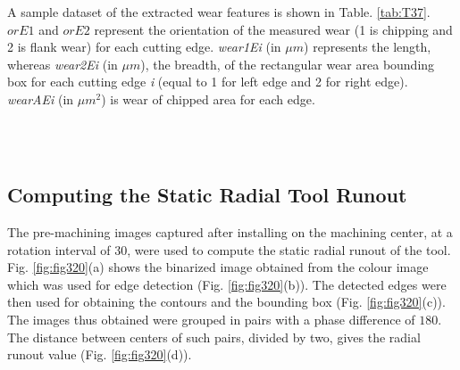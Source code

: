 \documentclass[preprint,review,12pt]{elsarticle}
\begin{document}
A sample dataset of the extracted wear features is shown in Table. \ref{tab:T37}. $orE1$ and $orE2$ represent the orientation of the measured wear (1 is chipping and 2 is flank wear) for each cutting edge. \emph{wear1Ei} (in $\mu{m}$) represents the length, whereas \emph{wear2Ei} (in $\mu{m}$), the breadth, of the rectangular wear area bounding box for each cutting edge \emph{i} (equal to 1 for left edge and 2 for right edge). \emph{wearAEi} (in $\mu{m}^2$) is wear of chipped area for each edge. \par

\begin{minipage}{\linewidth}
   \label{tab:T37}
  \centering
\end{minipage} \\\\

\subsection{Computing the Static Radial Tool Runout}\label{sec:sec43}
 The pre-machining images captured after installing on the machining center, at a rotation interval of $30$\textdegree, were used to compute the static radial runout of the tool. Fig. \ref{fig:fig320}(a) shows the binarized image obtained from the colour image which was used for edge detection (Fig. \ref{fig:fig320}(b)). The detected edges were then used for obtaining the contours and the bounding box (Fig. \ref{fig:fig320}(c)). The images thus obtained were grouped in pairs with a phase difference of $180$\textdegree. The distance between centers of such pairs, divided by two, gives the radial runout value (Fig. \ref{fig:fig320}(d)). \par
\end{document}
